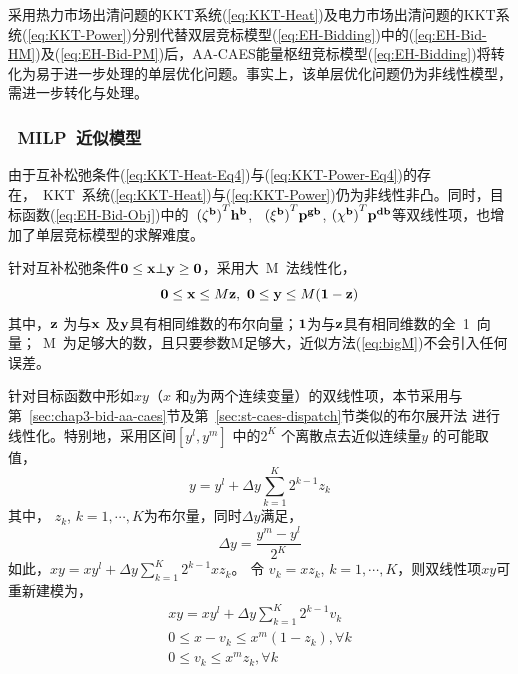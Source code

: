 采用热力市场出清问题的KKT系统(\ref{eq:KKT-Heat})及电力市场出清问题的KKT系统(\ref{eq:KKT-Power})分别代替双层竞标模型(\ref{eq:EH-Bidding})中的(\ref{eq:EH-Bid-HM})及(\ref{eq:EH-Bid-PM})后，AA-CAES能量枢纽竞标模型(\ref{eq:EH-Bidding})将转化为易于进一步处理的单层优化问题。事实上，该单层优化问题仍为非线性模型，需进一步转化与处理。

\subsubsection{~MILP~近似模型}
由于互补松弛条件(\ref{eq:KKT-Heat-Eq4})与(\ref{eq:KKT-Power-Eq4})的存在，~KKT~系统(\ref{eq:KKT-Heat})与(\ref{eq:KKT-Power})仍为非线性非凸。同时，目标函数(\ref{eq:EH-Bid-Obj})中的~${(\bf \zeta^b)}^T {\bf h^{b}}$, ~${(\bf \xi^b)}^T {\bf p^{gb}}$,  ${(\bf \chi^b)}^T {\bf p^{db}}$等双线性项，也增加了单层竞标模型的求解难度。

针对互补松弛条件$\bf 0 \le  x \bot y \ge 0$，采用大~M~法\cite{Big-M-1981}线性化，
\begin{equation}
{\bf 0} \le {\bf x} \le M {\bf z},~
{\bf 0} \le {\bf y} \le M ({\bf 1-z})
\label{eq:bigM}
\end{equation}
其中，$\bf z$ 为与$\bf x$ 及$\bf y$具有相同维数的布尔向量；$\bf 1$为与$\bf z$具有相同维数的全~1~向量；~M~为足够大的数，且只要参数M足够大，近似方法(\ref{eq:bigM})不会引入任何误差。

针对目标函数中形如$xy$（$x$ 和$y$为两个连续变量）的双线性项，本节采用与第~\ref{sec:chap3-bid-aa-caes}节及第~\ref{sec:st-caes-dispatch}节类似的布尔展开法\cite{Binary-Expansion-1,Binary-Expansion-2} 进行线性化。特别地，采用区间$[y^l,y^m]$ 中的$2^K$ 个离散点去近似连续量$y$ 的可能取值，
\begin{equation}
\label{eq:Binary-Expansion}
y = y^l + \Delta y \sum_{k=1}^K 2^{k-1} z_k
\end{equation}
其中， $z_k$, $k=1,\cdots,K$为布尔量，同时$\Delta y$满足，
\begin{equation}
\label{eq:Delta-y}
\Delta y = \dfrac{y^m-y^l}{2^K}
\end{equation}
如此，$xy = x y^l + \Delta y \sum_{k=1}^K 2^{k-1} x z_k$。 令 $v_k = x z_k$, $k=1,\cdots,K$，则双线性项$xy$可重新建模为，
\begin{subequations}
\label{eq:Binary-Expansion-xy}
\begin{gather}
x y = x y^l + \Delta y \sum_{k=1}^K 2^{k-1} v_k \label{eq:xy-BE-1}\\
0 \le x-v_{k} \le x^m (1-z_k), \forall k \label{eq:xy-BE-2}\\
0 \le v_k \le x^m z_k, \forall k \label{eq:xy-BE-3}
\end{gather}
\end{subequations}


